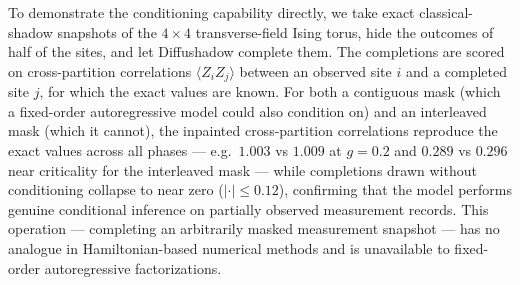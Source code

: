 
%


To demonstrate the conditioning capability directly, we take exact
classical-shadow snapshots of the $4\times4$ transverse-field Ising torus,
hide the outcomes of half of the sites, and let Diffushadow complete them.
The completions are scored on cross-partition correlations
$\langle Z_i Z_j\rangle$ between an observed site $i$ and a completed site
$j$, for which the exact values are known. For both a contiguous mask (which
a fixed-order autoregressive model could also condition on) and an
interleaved mask (which it cannot), the inpainted cross-partition
correlations reproduce the exact values across all phases --- e.g.\
$1.003$ vs $1.009$ at $g=0.2$ and $0.289$ vs $0.296$ near criticality for
the interleaved mask --- while completions drawn without conditioning
collapse to near zero ($|\cdot|\le 0.12$), confirming that the model
performs genuine conditional inference on partially observed measurement
records. This operation --- completing an arbitrarily masked measurement
snapshot --- has no analogue in Hamiltonian-based numerical methods and is
unavailable to fixed-order autoregressive factorizations.

